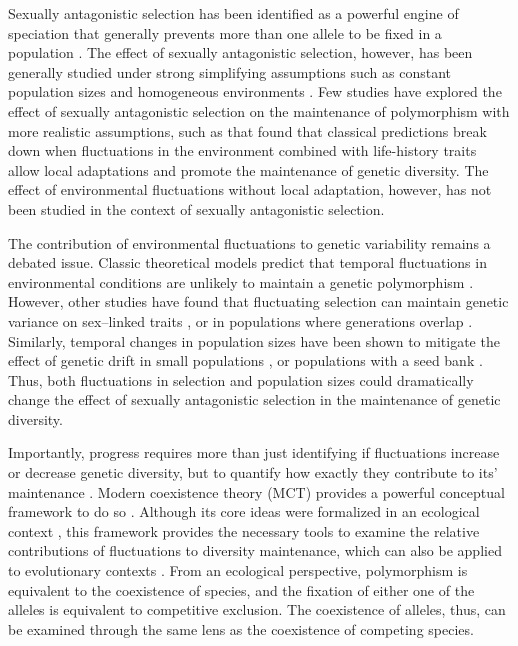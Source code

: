 \documentclass[12pt]{article}
\begin{document}
Sexually antagonistic selection has been identified as a powerful engine of speciation that generally prevents more than one allele to be fixed in a population \citep{gavrilets2014sexual}. The effect of sexually antagonistic selection, however, has been generally studied under strong simplifying assumptions such as constant population sizes and homogeneous environments \citep{kidwell1977regions, pamilo1979genic}. Few studies have explored the effect of sexually antagonistic selection on the maintenance of polymorphism with more realistic assumptions, such as \citet{connallon_evolutionary_2018} that found that classical predictions break down when fluctuations in the environment combined with life-history traits allow local adaptations and promote the maintenance of genetic diversity. The effect of environmental fluctuations without local adaptation, however, has not been studied in the context of sexually antagonistic selection.


The contribution of environmental fluctuations to genetic variability remains a debated issue. Classic theoretical models predict that temporal fluctuations in environmental conditions are unlikely to maintain a genetic polymorphism \citep{hedrick1974genetic,hedrick1986genetic}. However, other studies have found that fluctuating selection can maintain genetic variance on sex--linked traits \citep{reinhold2000maintenance}, or in populations where generations overlap \citep{ellner1994role, ellner1996patterns}. Similarly, temporal changes in population sizes have been shown to mitigate the effect of genetic drift in small populations \citep{pemberton1996maintenance}, or populations with a seed bank \citep{nunney2002effective}. Thus, both fluctuations in selection and population sizes could dramatically change the effect of sexually antagonistic selection in the maintenance of genetic diversity.


Importantly, progress requires more than just identifying if fluctuations increase or decrease genetic diversity, but to quantify how exactly they contribute to its' maintenance \citep{ellner2016quantify}. Modern coexistence theory (MCT) provides a powerful conceptual framework to do so \citep{Chesson2000,chesson1994multispecies, barabas_chessons_2018}. Although its core ideas were formalized in an ecological context \citep{chesson1994multispecies,chesson2000general}, this framework provides the necessary tools to examine the relative contributions of fluctuations to diversity maintenance, which can also be applied to evolutionary contexts  \citep{ellner1996patterns,reinhold2000maintenance}. From an ecological perspective, polymorphism is equivalent to the coexistence of species, and the fixation of either one of the alleles is equivalent to competitive exclusion. The coexistence of alleles, thus, can be examined through the same lens as the coexistence of competing species.
\end{document}
